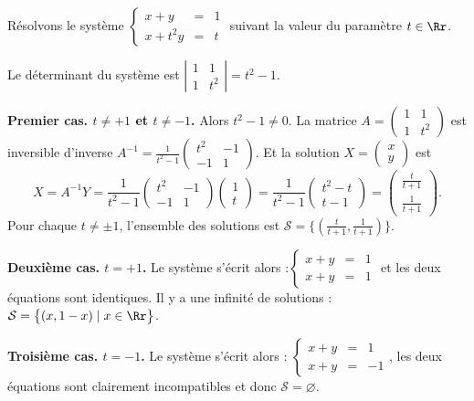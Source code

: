 \documentclass[class=report,crop=false]{standalone}
\begin{document}
\begin{exemple}
Résolvons le système
$
\left\{\begin{array}{rcl}
 x + y  & = & 1\\
 x + t^2 y & = & t
\end{array}\right.
$
suivant la valeur du paramètre $t\in \Rr$.

Le déterminant du système est $\left| \begin{smallmatrix} 1 & 1 \\ 1 & t^2 \end{smallmatrix}\right|= t^2-1$.

\textbf{Premier cas. $t\neq+1$ et $t\neq-1$.}
Alors $t^2-1\neq 0$. La matrice $A=\left( \begin{smallmatrix} 1 & 1 \\ 1 & t^2 \end{smallmatrix}\right)$
est inversible d'inverse $A^{-1} = \frac{1}{t^2-1}\left( \begin{smallmatrix} t^2 & -1 \\ -1 & 1 \end{smallmatrix}\right)$.
Et la solution $X=\left( \begin{smallmatrix} x \\ y \end{smallmatrix}\right)$ est
$$X = A^{-1} Y = \frac{1}{t^2-1}\begin{pmatrix} t^2 & -1 \\ -1 & 1 \end{pmatrix} \begin{pmatrix} 1 \\ t \end{pmatrix}
= \frac{1}{t^2-1}\begin{pmatrix} t^2-t\\ t-1 \end{pmatrix}
= \begin{pmatrix} \frac{t}{t+1} \\ \frac{1}{t+1} \end{pmatrix}.$$
Pour chaque $t\neq \pm1$, l'ensemble des solutions est
$\mathcal{S}= \big\lbrace \left(\frac{t}{t+1},\frac{1}{t+1}\right) \big\rbrace$.

\textbf{Deuxième cas. $t=+1$.}
Le système s'écrit alors :$
\left\{\begin{array}{rcl}
 x + y  & = & 1\\
 x + y & = & 1
\end{array}\right.
$ et les deux équations sont identiques. Il y a une infinité de solutions :
$\mathcal{S}= \big\lbrace (x,1-x) \mid x\in \Rr \big\rbrace$.


\textbf{Troisième cas. $t=-1$.}
Le système s'écrit alors :
$
\left\{\begin{array}{rcl}
 x + y  & = & 1\\
 x + y & = & -1
\end{array}\right.$,
les deux équations sont clairement incompatibles et donc $\mathcal{S}= \varnothing$.
\end{exemple}
\end{document}
